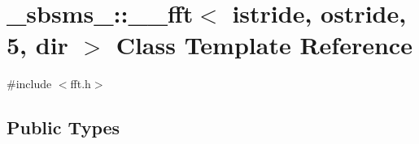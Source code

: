 \hypertarget{class__sbsms___1_1____fft_3_01istride_00_01ostride_00_015_00_01dir_01_4}{}\section{\+\_\+sbsms\+\_\+\+:\+:\+\_\+\+\_\+fft$<$ istride, ostride, 5, dir $>$ Class Template Reference}
\label{class__sbsms___1_1____fft_3_01istride_00_01ostride_00_015_00_01dir_01_4}


{\ttfamily \#include $<$fft.\+h$>$}

\subsection*{Public Types}

